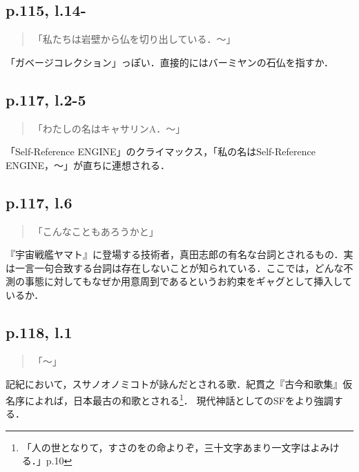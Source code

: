 \documentclass[10pt, a5paper, twoside]{ltjsarticle}
\begin{document}
        \subsection{p.115, l.14-}

            \begin{quote}
                「私たちは岩壁から仏を切り出している．〜」
            \end{quote}

            「ガベージコレクション」っぽい．直接的にはバーミヤンの石仏を指すか．

        \subsection{p.117, l.2-5}

            \begin{quote}
                「わたしの名はキャサリンA．〜」
            \end{quote}

            「Self-Reference ENGINE」のクライマックス，「私の名はSelf-Reference ENGINE，〜」が直ちに連想される．

        \subsection{p.117, l.6}

            \begin{quote}
                「こんなこともあろうかと」
            \end{quote}

            『宇宙戦艦ヤマト』に登場する技術者，真田志郎の有名な台詞とされるもの．実は一言一句合致する台詞は存在しないことが知られている．ここでは，どんな不測の事態に対してもなぜか用意周到であるというお約束をギャグとして挿入しているか．

        \subsection{p.118, l.1}

            \begin{quote}
                「〜」
            \end{quote}

                記紀において，スサノオノミコトが詠んだとされる歌．紀貫之『古今和歌集』仮名序によれば，日本最古の和歌とされる\footnote{「人の世となりて，すさのをの命よりぞ，三十文字あまり一文字はよみける．」\cite{kokin}p.10}\cite{kokin}． 現代神話としてのSFをより強調する．
\end{document}
